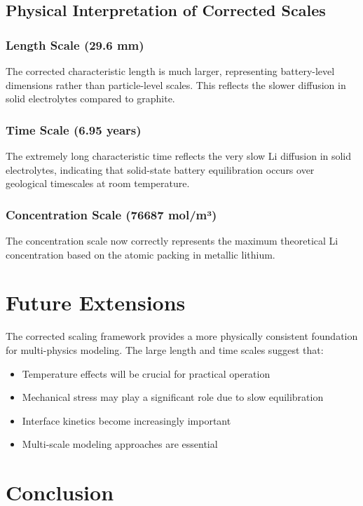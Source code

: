 \documentclass[11pt,a4paper]{article}
\begin{document}
\subsection{Physical Interpretation of Corrected Scales}

\subsubsection{Length Scale (29.6 mm)}
The corrected characteristic length is much larger, representing battery-level dimensions rather than particle-level scales. This reflects the slower diffusion in solid electrolytes compared to graphite.

\subsubsection{Time Scale (6.95 years)}
The extremely long characteristic time reflects the very slow Li diffusion in solid electrolytes, indicating that solid-state battery equilibration occurs over geological timescales at room temperature.

\subsubsection{Concentration Scale (76687 mol/m³)}
The concentration scale now correctly represents the maximum theoretical Li concentration based on the atomic packing in metallic lithium.

\section{Future Extensions}

The corrected scaling framework provides a more physically consistent foundation for multi-physics modeling. The large length and time scales suggest that:

\begin{itemize}
    \item Temperature effects will be crucial for practical operation
    \item Mechanical stress may play a significant role due to slow equilibration
    \item Interface kinetics become increasingly important
    \item Multi-scale modeling approaches are essential
\end{itemize}

\section{Conclusion}
\end{document}
